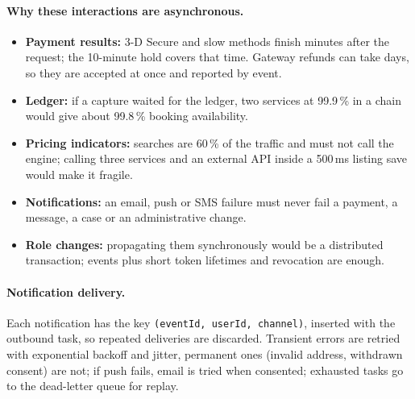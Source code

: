 \paragraph{Why these interactions are asynchronous.}
\begin{itemize}
  \item \textbf{Payment results:} 3-D Secure and slow methods finish minutes
    after the request; the 10-minute hold covers that time. Gateway refunds
    can take days, so they are accepted at once and reported by event.
  \item \textbf{Ledger:} if a capture waited for the ledger, two services at
    99.9\,\% in a chain would give about 99.8\,\% booking availability.
  \item \textbf{Pricing indicators:} searches are 60\,\% of the traffic and
    must not call the engine; calling three services and an external API
    inside a 500\,ms listing save would make it fragile.
  \item \textbf{Notifications:} an email, push or SMS failure must never fail
    a payment, a message, a case or an administrative change.
  \item \textbf{Role changes:} propagating them synchronously would be a
    distributed transaction; events plus short token lifetimes and revocation
    are enough.
\end{itemize}

\paragraph{Notification delivery.} Each notification has the key
\texttt{(eventId, userId, channel)}, inserted with the outbound task, so
repeated deliveries are discarded. Transient errors are retried with
exponential backoff and jitter, permanent ones (invalid address, withdrawn
consent) are not; if push fails, email is tried when consented; exhausted
tasks go to the dead-letter queue for replay.

